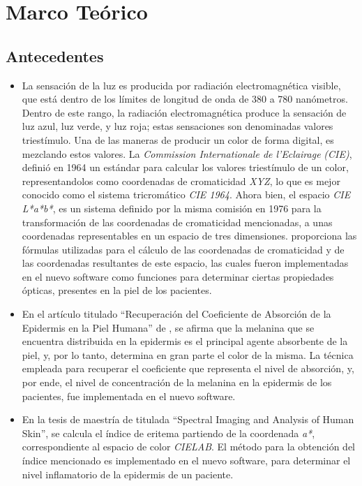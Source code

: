 \chapter{\label{cap:2}Marco Te\'{o}rico}

	\section{Antecedentes}	
		\begin{itemize}
		
			\item
				La sensaci\'{o}n de la luz es producida por radiaci\'{o}n electromagn\'{e}tica visible, que est\'{a} dentro de los l\'{i}mites de longitud de onda de 380 a 780 nan\'{o}metros. Dentro de este rango, la radiaci\'{o}n electromagn\'{e}tica produce la sensaci\'{o}n de luz azul, luz verde, y luz roja; estas sensaciones son denominadas valores triest\'{i}mulo. Una de las maneras de producir un color de forma digital, es mezclando estos valores. La \textit{\mbox{Commission} Internationale de l'Eclairage} \textit{(CIE)}, defini\'{o} en 1964 un est\'{a}ndar para calcular los valores triest\'{i}mulo de un color, representandolos como coordenadas de cromaticidad \textit{XYZ}, lo que es mejor conocido como el sistema tricrom\'{a}tico \textit{CIE 1964}. Ahora bien, el espacio \textit{CIE L*a*b*}, es un sistema definido por la misma comisi\'{o}n en 1976 para la \mbox{transformaci\'{o}n} de las coordenadas de cromaticidad mencionadas, a unas coordenadas representables en un espacio de tres dimensiones. \cite{Schanda} proporciona las f\'{o}rmulas utilizadas para el c\'{a}lculo de las coordenadas de cromaticidad y de las coordenadas resultantes de este espacio, las cuales fueron implementadas en el nuevo software como funciones para determinar ciertas propiedades \'{o}pticas, presentes en la piel de los pacientes.
			
			\item En el art\'{i}culo titulado ``Recuperaci\'{o}n del Coeficiente de Absorci\'{o}n de la Epidermis en la Piel Humana'' de \cite{Narea}, se afirma que la melanina que se encuentra distribuida en la epidermis es el  principal agente absorbente de la piel, y, por lo tanto, determina en gran parte el color de la misma. La t\'{e}cnica empleada para recuperar el coeficiente que representa el nivel de absorci\'{o}n, y, por ende, el nivel de concentraci\'{o}n de la melanina en la epidermis de los pacientes, fue implementada en el nuevo software.
			
			\item En la tesis de maestr\'{i}a de \cite{Bersha} titulada ``Spectral Imaging and Analysis of Human Skin'', se calcula el \'{i}ndice de eritema partiendo de la coordenada \textit{a*}, correspondiente al espacio de color \textit{CIELAB}. El m\'{e}todo para la obtenci\'{o}n del \'{i}ndice mencionado es implementado en el nuevo software, para determinar el nivel inflamatorio de la epidermis de un paciente.
		\end{itemize}

